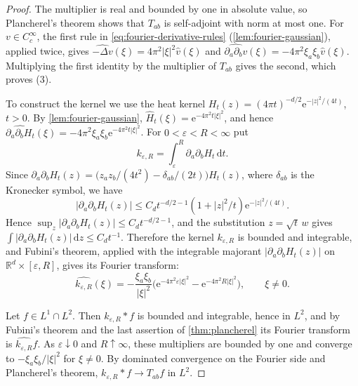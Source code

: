 \begin{proof}
The multiplier is real and bounded by one in absolute value, so Plancherel's theorem shows that $T_{ab}$ is self-adjoint with norm at most one. For $v\in C_c^\infty$, the first rule in \eqref{eq:fourier-derivative-rules} (\cref{lem:fourier-gaussian}), applied twice, gives $\widehat{-\Delta v}(\xi)=4\pi^2|\xi|^2\widehat v(\xi)$ and $\widehat{\partial_a\partial_bv}(\xi)=-4\pi^2\xi_a\xi_b\widehat v(\xi)$. Multiplying the first identity by the multiplier of $T_{ab}$ gives the second, which proves (3).

To construct the kernel we use the heat kernel $H_t(z)=(4\pi t)^{-d/2}\mathrm e^{-|z|^2/(4t)}$, $t>0$. By \cref{lem:fourier-gaussian}, $\widehat H_t(\xi)=\mathrm e^{-4\pi^2t|\xi|^2}$, and hence $\widehat{\partial_a\partial_bH_t}(\xi)=-4\pi^2\xi_a\xi_b\mathrm e^{-4\pi^2t|\xi|^2}$. For $0<\varepsilon<R<\infty$ put
\[
 k_{\varepsilon,R}=\int_\varepsilon^R\partial_a\partial_bH_t\,\mathrm d t.
\]
Since $\partial_a\partial_bH_t(z)=\bigl(z_az_b/(4t^2)-\delta_{ab}/(2t)\bigr)H_t(z)$, where $\delta_{ab}$ is the Kronecker symbol, we have
\[
 |\partial_a\partial_bH_t(z)|\leq C_dt^{-d/2-1}(1+|z|^2/t)\mathrm e^{-|z|^2/(4t)}.
\]
Hence $\sup_z|\partial_a\partial_bH_t(z)|\leq C_dt^{-d/2-1}$, and the substitution $z=\sqrt t\,w$ gives $\int|\partial_a\partial_bH_t(z)|\,\mathrm d z\leq C_dt^{-1}$. Therefore the kernel $k_{\varepsilon,R}$ is bounded and integrable, and Fubini's theorem, applied with the integrable majorant $|\partial_a\partial_bH_t(z)|$ on $\mathbb R^d\times[\varepsilon,R]$, gives its Fourier transform:
\[
 \widehat{k_{\varepsilon,R}}(\xi)=-\frac{\xi_a\xi_b}{|\xi|^2}
    \bigl(\mathrm e^{-4\pi^2\varepsilon|\xi|^2}
          -\mathrm e^{-4\pi^2R|\xi|^2}\bigr),\qquad\xi\neq0.
\]

Let $f\in L^1\cap L^2$. Then $k_{\varepsilon,R}*f$ is bounded and integrable, hence in $L^2$, and by Fubini's theorem and the last assertion of \cref{thm:plancherel} its Fourier transform is $\widehat{k_{\varepsilon,R}}\widehat f$. As $\varepsilon\downarrow0$ and $R\uparrow\infty$, these multipliers are bounded by one and converge to $-\xi_a\xi_b/|\xi|^2$ for $\xi\neq0$. By dominated convergence on the Fourier side and Plancherel's theorem, $k_{\varepsilon,R}*f\to T_{ab}f$ in $L^2$.


\end{proof}
